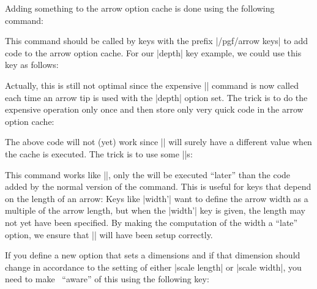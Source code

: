 Adding something to the arrow option cache is done using the following command:

\begin{command}{\pgfarrowsaddtooptions{}}
    This command should be called by keys with the prefix |/pgf/arrow keys| to
    add code to the arrow option cache. For our |depth| key example, we could
    use this key as follows:
\begin{codeexample}[code only]
\pgfkeys{/pgf/arrow keys/depth/.code=
  \pgfarrowsaddtooptions{\pgfmathsetlength{\pgfarrowdepth}{#1}}
\end{codeexample}
    Actually, this is still not optimal since the expensive |\pgfmathsetlength|
    command is now called each time an arrow tip is used with the |depth|
    option set. The trick is to do the expensive operation only once and then
    store only very quick code in the arrow option cache:
\begin{codeexample}[code only]
\pgfkeys{/pgf/arrow keys/depth/.code=
  \pgfmathsetlength{\somedimen}{#1}
  \pgfarrowsaddtooptions{\pgfarrowdepth=\somedimen} %
\end{codeexample}
    The above code will not (yet) work since |\somedimen| will surely have a
    different value when the cache is executed. The trick is to use some
    |\expandafter|s:
\begin{codeexample}[code only]
\pgfkeys{/pgf/arrow keys/depth/.code=
  \pgfmathsetlength{\somedimen}{#1}
  \expandafter\pgfarrowsaddtooptions\expandafter{\expandafter\pgfarrowdepth\expandafter=\the\somedimen}
\end{codeexample}
\end{command}

\begin{command}{\pgfarrowsaddtolateoptions{}}
    This command works like |\pgfarrowsaddtooptions|, only the  will
    be executed ``later'' than the code added by the normal version of the
    command. This is useful for keys that depend on the length of an arrow:
    Keys like |width'| want to define the arrow width as a multiple of the
    arrow length, but when the |width'| key is given, the length may not yet
    have been specified. By making the computation of the width a ``late''
    option, we ensure that |\pgfarrowlength| will have been setup correctly.
\end{command}

If you define a new option that sets a dimensions and if that dimension should
change in accordance to the setting of either |scale length| or |scale width|,
you need to make \pgfname\ ``aware'' of this using the following key:

